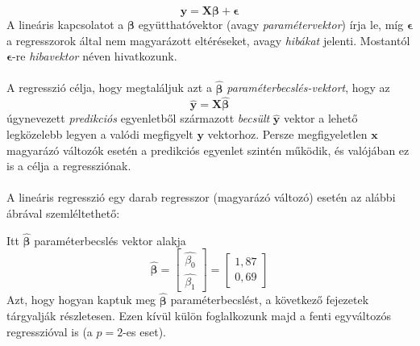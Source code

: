 \documentclass[14p]{report}
\def\pmb{\boldsymbol}
\def\ebeta{\hat{\pmb{\beta}}}
\def\e{\epsilon}
\newcounter{x}
\newcounter{y}
\newcounter{z}
\begin{document}
	\[
	\pmb{y} = \pmb{X}\pmb{\beta} + \pmb{\epsilon}
	\]
	A lineáris kapcsolatot a $\pmb{\beta}$ együtthatóvektor (avagy \emph{paramétervektor}) írja le, míg $\pmb{\e}$ a regresszorok által nem magyarázott eltéréseket, avagy \emph{hibákat} jelenti. Mostantól $\pmb{\e}$-re \emph{hibavektor} néven hivatkozunk.
	\\
	\\
	A regresszió célja, hogy megtaláljuk azt a $\ebeta$ \emph{paraméterbecslés-vektort}, hogy az 
	\[
		\hat{\pmb{y}} = \pmb{X}\ebeta 
	\]
	úgynevezett \emph{predikciós} egyenletből származott \emph{becsült} $\hat{\pmb{y}}$ vektor a lehető legközelebb legyen a valódi megfigyelt $\pmb{y}$ vektorhoz. Persze megfigyeletlen $\pmb{x}$ magyarázó változók esetén a predikciós egyenlet szintén működik, és valójában ez is a célja a regressziónak.
	\\
	\\
	A lineáris regresszió egy darab regresszor (magyarázó változó) esetén az alábbi ábrával szemléltethető:
	
	\begin{center}
	\end{center}
	Itt $\ebeta$ paraméterbecslés vektor alakja
	\[
	\ebeta = 
	\begin{bmatrix}
		\hat{\beta_0} \\
		\hat{\beta_1}
	\end{bmatrix}
	=
	\begin{bmatrix}
		1,87 \\
		0,69
	\end{bmatrix}
	\]
	Azt, hogy hogyan kaptuk meg $\ebeta$ paraméterbecslést, a következő fejezetek tárgyalják részletesen. Ezen kívül külön foglalkozunk majd a fenti egyváltozós regresszióval is (a $p=2$-es eset).
	
\end{document}

